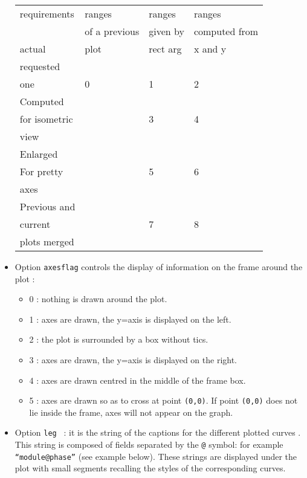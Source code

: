 \begin{itemize}
\begin{tabular}{|l|l|l|l|}                               \hline
   requirements&ranges       &ranges    &ranges       \\    
               &of a previous&given by  &computed from\\
actual         &plot         &rect arg  &x and y      \\ \hline
requested      &             &          &             \\
one            &        0    &      1   &        2    \\ \hline
Computed       &             &          &             \\
for isometric  &             &      3   &        4    \\
view           &             &          &             \\ \hline
Enlarged       &             &          &             \\  
For pretty     &             &      5   &        6    \\
axes           &             &          &             \\ \hline
Previous and   &             &          &             \\
current        &             &      7   &        8    \\
plots merged   &             &          &             \\ \hline
\end{tabular}
\item Option {\tt axesflag} controls the display of information on the frame around the plot :
\begin{itemize}
\item 0
: 
nothing is drawn around the plot.
\item 1 
: 
axes are drawn, the y=axis is displayed on the left. 
\item 2
: 
the plot is surrounded by a box without tics.
\item 3 
: 
axes are drawn, the y=axis is displayed on the right. 
\item 4
: 
axes are drawn centred in the middle of the frame box. 

\item 5 
: 
axes are drawn so as to cross at point {\tt (0,0)}.  If point
{\tt (0,0)} does not lie inside the frame, axes will not appear on the graph.
\end{itemize}

\item Option {\tt leg } 	 : it is the string of the captions for the different 
plotted curves . This string is composed of fields separated by the {\tt @} 
symbol: for example  {\tt ``module@phase''} (see example below). These 
strings are
displayed under the plot with  small segments recalling the styles of the 
corresponding curves.


\end{itemize}
